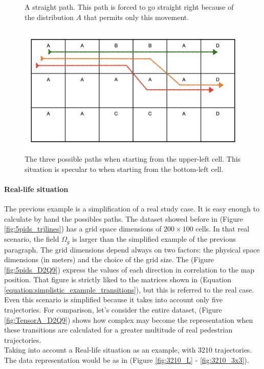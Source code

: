 \documentclass[class=article, crop=false]{standalone}
\begin{document}
\begin{figure}[ht]
\begin{minipage}[c]{0.5\linewidth}
\captionsetup{width=.8\linewidth}
\caption{A straight path. This path is forced to go straight right because of the distribution $A$ that permits only this movement.}
\label{fig:simplistic_example_4}
\end{minipage}
\begin{minipage}[c]{0.5\linewidth}
\centering
\includegraphics[scale=0.1]{draw/Thesis_plots/Thesis_plots.005}
\captionsetup{width=.8\linewidth}
\caption{The three possible paths when starting from the upper-left cell. This situation is specular to when starting from the bottom-left cell.}
\label{fig:simplistic_example_5}
\end{minipage}
\end{figure}

\paragraph{Real-life situation}
The previous example is a simplification of a real study case.
It is easy enough to calculate by hand the possibles paths.
The dataset showed before in (Figure \ref{fig:5pids_trjlines}) has a grid space dimensions of $200 \times 100$ cells.
In that real scenario, the field $\Omega_g$ is larger than the simplified example of the previous paragraph.
The grid dimensions depend always on two factors: the physical space dimensions (in meters) and the choice of the grid size.
The (Figure \ref{fig:5pids_D2Q9}) express the values of each direction in correlation to the map position.
That figure is strictly liked to the matrices shown in (Equation \ref{equation:simplistic_example_transitions}), but this is referred to the real case.
Even this scenario is simplified because it takes into account only five trajectories.
For comparison, let's consider the entire dataset, (Figure \ref{fig:TensorA_D2Q9}) shows how complex may become the representation when these transitions are calculated for a greater multitude of real pedestrian trajectories.
\\Taking into account a Real-life situation as an example, with 3210 trajectories.
The data representation would be as in (Figure \ref{fig:3210_L} - \ref{fig:3210_3x3}).
\end{document}
